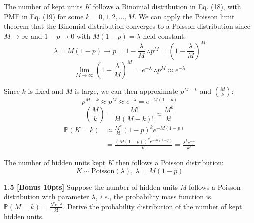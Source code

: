 \documentclass{article}
\begin{document}
{\color{blue}
The number of kept units $K$ follows a Binomial distribution in Eq. (18), with PMF in Eq. (19) for some $k=0,1,2,...,M$. We can apply the Poisson limit theorem that the Binomial distribution converges to a Poisson distribution since $M \rightarrow \infty$ and $1-p \rightarrow 0$ with $M(1-p)= \lambda$ held constant.
\begin{equation}
    \lambda = M(1-p) \rightarrow p = 1-\frac{\lambda}{M} \ \therefore p^M = (1-\frac{\lambda}{M})^M
\end{equation}
\begin{equation}
    \lim_{M \rightarrow \infty}\left(1-\frac{\lambda}{M}\right)^M= e^{-\lambda} \ \therefore p^M \approx e^{-\lambda} 
\end{equation}

Since $k$ is fixed and $M$ is large, we can then approximate $p^{M-k}$ and $\binom{M}{k}$:
\begin{equation}
    p^{M-k} \approx p^M \approx e^{-\lambda}= e^{-M(1-p)}
\end{equation}
\begin{equation}
    \binom{M}{k}= \frac{M!}{k!(M-k)!} \approx \frac{M^k}{k!}
\end{equation}
\begin{equation}
\begin{aligned}
    \mathbb{P}(K=k) &\approx \frac{M^k}{k!}(1-p)^ke^{-M(1-p)}\\
    &= \frac{(M(1-p))^ke^{-M(1-p)}}{k!}= \frac{\lambda ^k e^{-\lambda}}{k!}
\end{aligned}
\end{equation}

The number of hidden units kept $K$ then follows a Poisson distribution:
\begin{equation}
    K \sim \text{Poisson}(\lambda), \ \lambda = M(1-p)
\end{equation}
}

\noindent
\textbf{1.5 [Bonus 10pts]} Suppose the number of hidden units \textit{M} follows a Poisson distribution with parameter $\lambda$, \textit{i.e.}, the probability mass function is $\mathbb{P}(M = k) = \frac{\lambda^{k}e^{-\lambda}}{k!}$. Derive the probability
distribution of the number of kept hidden units.\\
\end{document}
